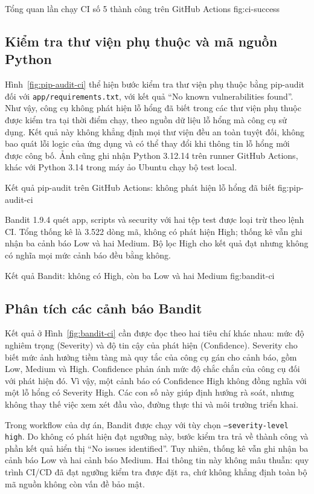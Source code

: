 {Tổng quan lần chạy CI số 5 thành công trên GitHub Actions}
{fig:ci-success}

\subsection{Kiểm tra thư viện phụ thuộc và mã nguồn Python}
Hình~\ref{fig:pip-audit-ci} thể hiện bước kiểm tra thư viện phụ thuộc bằng pip-audit đối với \nolinkurl{app/requirements.txt}, với kết quả ``No known vulnerabilities found''. Như vậy, công cụ không phát hiện lỗ hổng đã biết trong các thư viện phụ thuộc được kiểm tra tại thời điểm chạy, theo nguồn dữ liệu lỗ hổng mà công cụ sử dụng. Kết quả này không khẳng định mọi thư viện đều an toàn tuyệt đối, không bao quát lỗi logic của ứng dụng và có thể thay đổi khi thông tin lỗ hổng mới được công bố. Ảnh cũng ghi nhận Python 3.12.14 trên runner GitHub Actions, khác với Python 3.14 trong máy ảo Ubuntu chạy bộ test local.

{Kết quả pip-audit trên GitHub Actions: không phát hiện lỗ hổng đã biết}
{fig:pip-audit-ci}

Bandit 1.9.4 quét app, scripts và security với hai tệp test được loại trừ theo lệnh CI. Tổng thống kê là 3.522 dòng mã, không có phát hiện High; thống kê vẫn ghi nhận ba cảnh báo Low và hai Medium. Bộ lọc High cho kết quả đạt nhưng không có nghĩa mọi mức cảnh báo đều bằng không.

{Kết quả Bandit: không có High, còn ba Low và hai Medium}
{fig:bandit-ci}

\subsection{Phân tích các cảnh báo Bandit}
Kết quả ở Hình~\ref{fig:bandit-ci} cần được đọc theo hai tiêu chí khác nhau: mức độ nghiêm trọng (Severity) và độ tin cậy của phát hiện (Confidence). Severity cho biết mức ảnh hưởng tiềm tàng mà quy tắc của công cụ gán cho cảnh báo, gồm Low, Medium và High. Confidence phản ánh mức độ chắc chắn của công cụ đối với phát hiện đó. Vì vậy, một cảnh báo có Confidence High không đồng nghĩa với một lỗ hổng có Severity High. Các con số này giúp định hướng rà soát, nhưng không thay thế việc xem xét đầu vào, đường thực thi và môi trường triển khai.

Trong workflow của dự án, Bandit được chạy với tùy chọn \texttt{--severity-level high}. Do không có phát hiện đạt ngưỡng này, bước kiểm tra trả về thành công và phần kết quả hiển thị ``No issues identified''. Tuy nhiên, thống kê vẫn ghi nhận ba cảnh báo Low và hai cảnh báo Medium. Hai thông tin này không mâu thuẫn: quy trình CI/CD đã đạt ngưỡng kiểm tra được đặt ra, chứ không khẳng định toàn bộ mã nguồn không còn vấn đề bảo mật.

